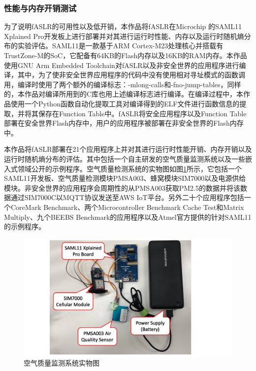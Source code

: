 \documentclass[UTF8,12pt,a4paper]{ctexart}
\numberwithin{figure}{section}
\begin{document}
\subsubsection{性能与内存开销测试}
\par 为了说明fASLR的可用性以及低开销，本作品将fASLR在Microchip 的SAML11 Xplained Pro开发板上进行部署并对其进行运行时性能、内存以及运行时随机熵分布的实验评估。SAML11是一款基于ARM Cortex-M23处理核心并搭载有TrustZone-M的SoC，它配备有64KB的Flash内存以及16KB的RAM内存。本作品使用GNU Arm Embedded Toolchain对fASLR以及非安全世界的应用程序进行编译，其中，为了使非安全世界应用程序的代码中没有使用相对寻址模式的函数调用，编译时使用了两个额外的编译标志：-mlong-calls和-fno-jump-tables，同样的，本作品对编译所用到的C库也用上述编译标志进行编译。在编译过程中，本作品使用一个Python函数自动化提取工具对编译得到的ELF文件进行函数信息的提取，并将其保存在Function Table中。fASLR将安全应用程序以及Function Table部署在安全世界Flash内存中，用户的应用程序被部署在非安全世界的Flash内存中。
\par 本作品将fASLR部署在21个应用程序上并对其进行运行时性能开销、内存开销以及运行时随机熵分布的评估。其中包括一个自主研发的空气质量监测系统以及一些嵌入式领域公开的示例程序。空气质量检测系统的实物图如图\ref{physicalDrawing}所示，它包括一个SAML11开发板、空气质量检测模块PMSA003、蜂窝模块SIM7000以及电源供给模块。非安全世界的应用程序会周期性的从PMSA003获取PM2.5的数据并将该数据通过SIM7000C以MQTT协议发送至AWS IoT平台。另外二十个应用程序包括一个CoreMark Benchmark\cite{CoreMarkBenchmark}、两个Microcontroller Benchmark Cache Test和Matrix Multiply、九个BEEBS Benchmark\cite{BEEBSBenchmark}的应用程序以及Atmel官方\cite{Atmel}提供的针对SAML11的示例程序。
\begin{figure}[H] %
    \label{physicalDrawing}
    \centering
    \includegraphics[scale=0.8]{graph/physicalDrawing.png}
    \caption{空气质量监测系统实物图}
\end{figure}
\end{document}
